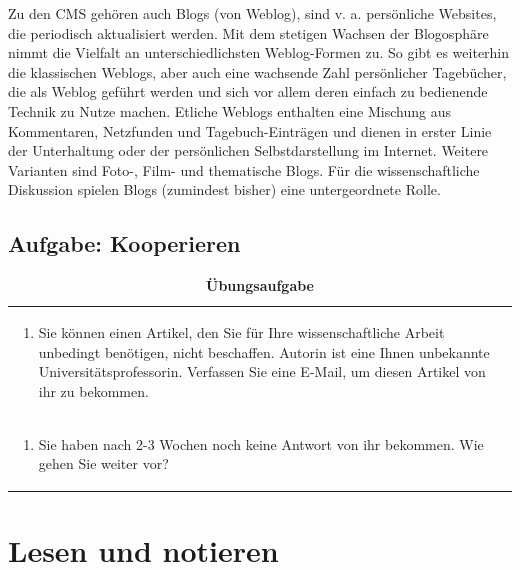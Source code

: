 \documentclass[]{book}
\providecommand{\tightlist}{%
  \setlength{\itemsep}{0pt}\setlength{\parskip}{0pt}}
\theoremstyle{definition}
\theoremstyle{definition}
\theoremstyle{definition}
\theoremstyle{remark}
\begin{document}
Zu den CMS gehören auch Blogs (von Weblog), sind v. a. persönliche
Websites, die periodisch aktualisiert werden. Mit dem stetigen Wachsen
der Blogosphäre nimmt die Vielfalt an unterschiedlichsten Weblog-Formen
zu. So gibt es weiterhin die klassischen Weblogs, aber auch eine
wachsende Zahl persönlicher Tagebücher, die als Weblog geführt werden
und sich vor allem deren einfach zu bedienende Technik zu Nutze machen.
Etliche Weblogs enthalten eine Mischung aus Kommentaren, Netzfunden und
Tagebuch-Einträgen und dienen in erster Linie der Unterhaltung oder der
persönlichen Selbstdarstellung im Internet. Weitere Varianten sind
Foto-, Film- und thematische Blogs. Für die wissenschaftliche Diskussion
spielen Blogs (zumindest bisher) eine untergeordnete Rolle.

\section{Aufgabe: Kooperieren}\label{aufgabe-kooperieren}

\begin{longtable}[]{@{}l@{}}
\caption{\textbf{\label{tab:aufgabe4-test} Übungsaufgabe}}\tabularnewline
\toprule
\begin{minipage}[t]{0.97\columnwidth}\raggedright\strut
\begin{enumerate}
\def\labelenumi{\arabic{enumi}.}
\tightlist
\item
  Sie können einen Artikel, den Sie für Ihre wissenschaftliche Arbeit
  unbedingt benötigen, nicht beschaffen. Autorin ist eine Ihnen
  unbekannte Universitätsprofessorin. Verfassen Sie eine E-Mail, um
  diesen Artikel von ihr zu bekommen. \vspace{-6mm}
\end{enumerate}\strut
\end{minipage}\tabularnewline
\begin{minipage}[t]{0.97\columnwidth}\raggedright\strut
\begin{enumerate}
\def\labelenumi{\arabic{enumi}.}
\setcounter{enumi}{1}
\tightlist
\item
  Sie haben nach 2-3 Wochen noch keine Antwort von ihr bekommen. Wie
  gehen Sie weiter vor?
\end{enumerate}\strut
\end{minipage}\tabularnewline
\bottomrule
\end{longtable}

\hypertarget{lesen}{\chapter{Lesen und notieren}\label{lesen}}
\end{document}

